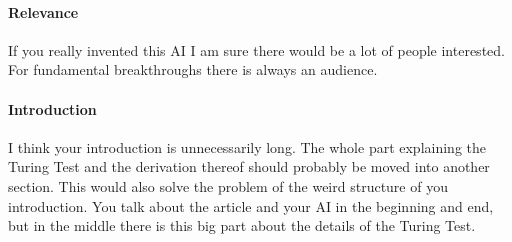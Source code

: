 \documentclass[12pt, a4paper]{article}
\begin{document}
\paragraph{Relevance}
If you really invented this AI I am sure there would be a lot of people interested. For fundamental breakthroughs there is always an audience.

\paragraph{Introduction}
I think your introduction is unnecessarily long. The whole part explaining the Turing Test and the derivation thereof should probably be moved into another section.
This would also solve the problem of the weird structure of you introduction. You talk about the article and your AI in the beginning and end, but in the middle there is this big part about the details of the Turing Test.
\end{document}
